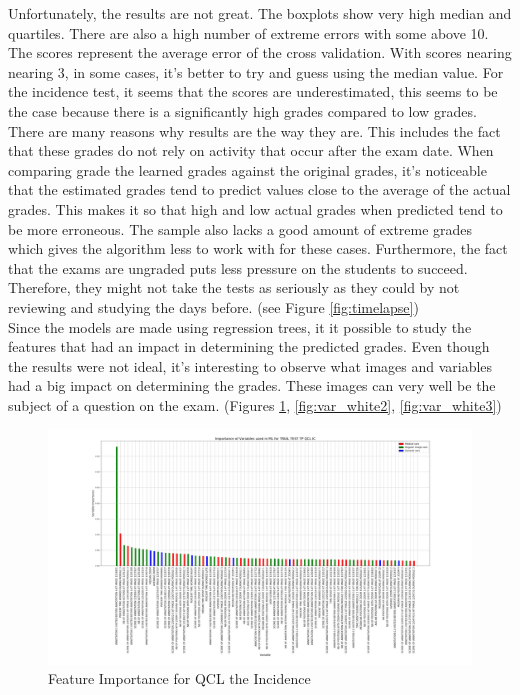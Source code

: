 \documentclass[a4paper,11pt]{report}
\numberwithin{figure}{section} %
\begin{document}
    Unfortunately, the results are not great.
    The boxplots show very high median and quartiles.
    There are also a high number of extreme errors with some above 10.
    The scores represent the average error of the cross validation.
    With scores nearing nearing 3, in some cases, it's better to try and guess using the median value.
    For the incidence test, it seems that the scores are underestimated, this seems to be the case because there is a significantly high grades compared to low grades.
    There are many reasons why results are the way they are.
    This includes the fact that these grades do not rely on activity that occur after the exam date.
    When comparing grade the learned grades against the original grades, it's noticeable that the estimated grades tend to predict values close to the average of the actual grades.
    This makes it so that high and low actual grades when predicted tend to be more erroneous.
    The sample also lacks a good amount of extreme grades which gives the algorithm less to work with for these cases.
    Furthermore, the fact that the exams are ungraded puts less pressure on the students to succeed.
    Therefore, they might not take the tests as seriously as they could by not reviewing and studying the days before. (see Figure \ref{fig:timelapse}) \\


  Since the models are made using regression trees, it it possible to study the features that had an impact in determining the predicted grades.
  Even though the results were not ideal, it's interesting to observe what images and variables had a big impact on determining the grades.
  These images can very well be the subject of a question on the exam. (Figures \ref{fig:var_white1}, \ref{fig:var_white2}, \ref{fig:var_white3})

     \begin{figure}[H]
      \centering
      \includegraphics[width=.95\linewidth]{plots/var_importance_TRIAL_TEST_TP_QCL_IC_2018-04-29_14_31_17.png}
      \caption{Feature Importance for QCL the Incidence}
      \label{fig:var_white1}
      \end{figure}
\end{document}
